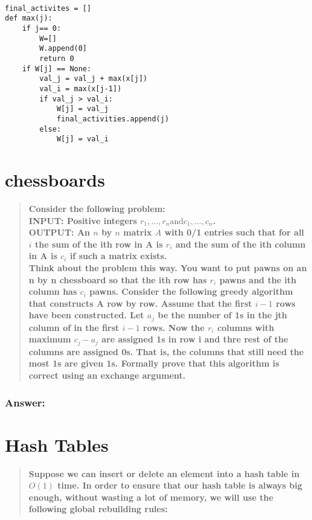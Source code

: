 \documentclass[titlepage]{article}\usepackage[]{graphicx}\usepackage[]{color}
\begin{document}
\begin{lstlisting}

final_activites = []
def max(j):
	if j== 0:
		W=[]
		W.append(0]
		return 0
	if W[j] == None:
		val_j = val_j + max(x[j])
		val_i = max(x[j-1])
		if val_j > val_i:
			W[j] = val_j
			final_activities.append(j)
		else:
			W[j] = val_i
\end{lstlisting}



\section{chessboards}

\begin{quote}
  \textbf{Consider the following problem: \\
	INPUT: Positive integers $r_1, \dots , r_n \text{and} c_1, \dots , c_n$. \\
	OUTPUT: An $n$ by $n$ matrix $A$ with 0/1 entries such that for all $i$ the
	sum of the ith row in A is $r_i$ and the sum of the ith column in A is
	$c_i$ if such a matrix exists. \\
	Think about the problem this way. You want to put pawns on an n by n
	chessboard so that the ith row has $r_i$ pawns and the ith column has $c_i$
	pawns. Consider the following greedy algorithm that constructs A row by
	row. Assume that the first $i - 1$ rows have been constructed. Let $a_j$ be
	the number of 1s in the jth column of in the first $i-1$ rows. Now the
	$r_i$ columns with maximum $c_j - a_j$ are assigned 1s in row i and thre
	rest of the columns are assigned 0s. That is, the columns that still need
	the most 1s are given 1s. Formally prove that this algorithm is correct
  using an exchange argument.}
\end{quote}


\subsubsection{Answer: }

\section{Hash Tables}
\begin{quote}
  \textbf{Suppose we can insert or delete an element into a hash table in
	$O(1)$ time. In order to ensure that our hash table is always big enough,
	without wasting a lot of memory, we will use the following global
  rebuilding rules:}
\end{quote}
\end{document}
